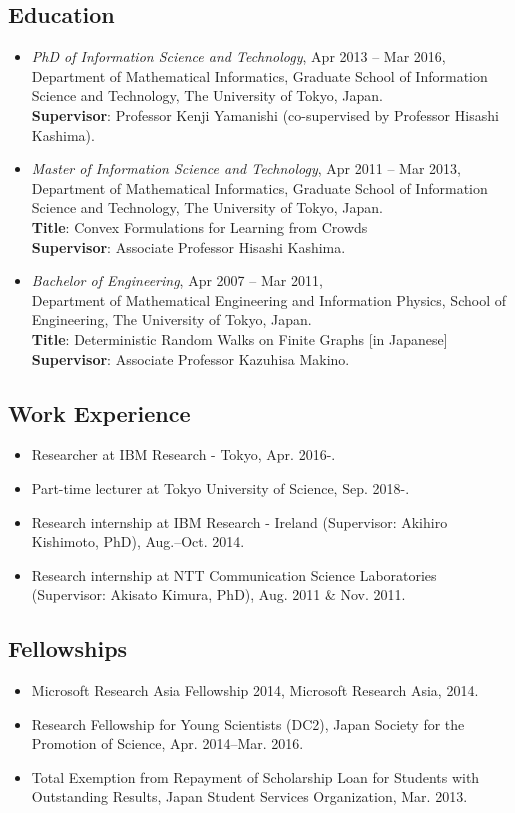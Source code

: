 \documentclass[a4paper,9pt]{article}
\begin{document}
\subsection*{Education}
\begin{itemize}
 \item \textit{PhD of Information Science and Technology}, Apr 2013 -- Mar 2016,\\
Department of Mathematical Informatics, Graduate School of Information Science and Technology, The University of Tokyo, Japan.\\
{\bf Supervisor}: Professor Kenji Yamanishi (co-supervised by Professor Hisashi Kashima).
 \item \textit{Master of Information Science and Technology}, Apr 2011 -- Mar 2013,\\
Department of Mathematical Informatics, Graduate School of Information Science and Technology, The University of Tokyo, Japan.\\
{\bf Title}: Convex Formulations for Learning from Crowds\\
{\bf Supervisor}: Associate Professor Hisashi Kashima.
 \item \textit{Bachelor of Engineering}, Apr 2007 -- Mar 2011, \\
Department of Mathematical Engineering and Information Physics, School of Engineering, The University of Tokyo, Japan.\\
{\bf Title}: Deterministic Random Walks on Finite Graphs [in Japanese]\\
{\bf Supervisor}: Associate Professor Kazuhisa Makino.
\end{itemize}

\subsection*{Work Experience}
\begin{itemize}
 \item Researcher at IBM Research - Tokyo, Apr. 2016-.
 \item Part-time lecturer at Tokyo University of Science, Sep. 2018-.
 \item Research internship at IBM Research - Ireland (Supervisor: Akihiro Kishimoto, PhD), Aug.--Oct. 2014.
 \item Research internship at NTT Communication Science Laboratories (Supervisor: Akisato Kimura, PhD), Aug. 2011 \& Nov. 2011.
\end{itemize}

\subsection*{Fellowships}
\begin{itemize}
 \item Microsoft Research Asia Fellowship 2014, Microsoft Research Asia, 2014.
 \item Research Fellowship for Young Scientists (DC2), Japan Society for the Promotion of Science, Apr. 2014--Mar. 2016.
 \item Total Exemption from Repayment of Scholarship Loan for Students with Outstanding Results, Japan Student Services Organization, Mar. 2013.
\end{itemize}
\end{document}
